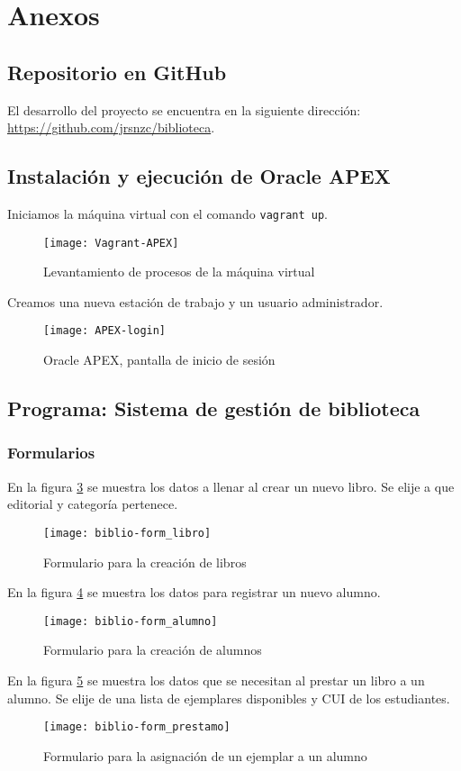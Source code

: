 \section{Anexos}
\subsection{Repositorio en GitHub}
El desarrollo del proyecto se encuentra en la siguiente dirección: \url{https://github.com/jrsnzc/biblioteca}.

\subsection{Instalación y ejecución de Oracle APEX}
Iniciamos la máquina virtual con el comando \lstinline$vagrant up$.
\begin{figure}[H]
  \centering
  \texttt{[image: Vagrant-APEX]}
  \caption{Levantamiento de procesos de la máquina virtual}
  \label{fig:vagrant-apex}
\end{figure}

Creamos una nueva estación de trabajo y un usuario administrador.
\begin{figure}[H]
  \centering
  \texttt{[image: APEX-login]}
  \caption{Oracle APEX, pantalla de inicio de sesión}
  \label{fig:apex-login}
\end{figure}

\subsection{Programa: Sistema de gestión de biblioteca}
\subsubsection{Formularios}
En la figura \ref{fig:biblio-form_libro} se muestra los datos a llenar al crear un nuevo libro. Se elije a que editorial y categoría pertenece.
\begin{figure}[H]
  \centering
  \texttt{[image: biblio-form\_libro]}
  \caption{Formulario para la creación de libros}
  \label{fig:biblio-form_libro}
\end{figure}
En la figura \ref{fig:biblio-form_alumno} se muestra los datos para registrar un nuevo alumno.
\begin{figure}[H]
  \centering
  \texttt{[image: biblio-form\_alumno]}
  \caption{Formulario para la creación de alumnos}
  \label{fig:biblio-form_alumno}
\end{figure}
En la figura \ref{fig:biblio-form_prestamo} se muestra los datos que se necesitan al prestar un libro a un alumno. Se elije de una lista de ejemplares disponibles y CUI de los estudiantes.
\begin{figure}[H]
  \centering
  \texttt{[image: biblio-form\_prestamo]}
  \caption{Formulario para la asignación de un ejemplar a un alumno}
  \label{fig:biblio-form_prestamo}
\end{figure}
